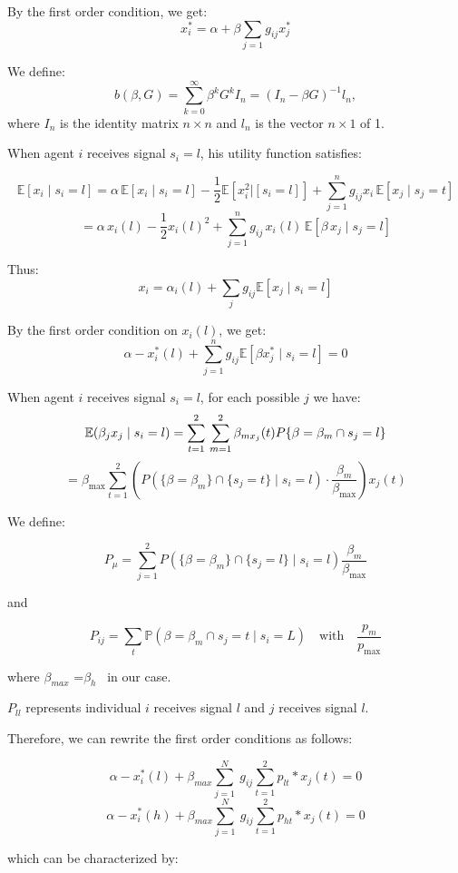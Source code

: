 \documentclass[12pt]{article}
\begin{document}
By the first order condition, we get:
\[
x_i^* = \alpha + \beta \sum_{j = 1} g_{ij} x_j^*
\]

We define:
\[
b(\beta, G) = \sum_{k=0}^{\infty} \beta^k G^k I_n = (I_n - \beta G)^{-1} l_n,
\]
where \( I_n \) is the identity matrix \( n \times n \) and \( l_n \) is the vector \( n \times 1 \) of 1.

When agent $i$ receives signal $s_i = l$, his utility function satisfies:


\[
\mathbb{E}[x_i \mid s_i = l] = \alpha \, \mathbb{E}[x_i \mid s_i = l]
-\frac{1}{2}\mathbb{E}[x_i^2|[s_i=l]]+ \sum_{j = 1}^n g_{ij} x_i\, \mathbb{E}[x_j \mid s_j = t]
\]
\[
= \alpha \, x_i(l) - \frac{1}{2} x_i(l)^2 + \sum_{j=1}^{n} g_{ij} \, x_i(l) \, \mathbb{E}\left[ \beta \, x_j \mid s_j = l \right]
\]


Thus:
\[
x_i = \alpha_i(l) + \sum_j g_{ij} \mathbb{E}[x_j \mid s_i = l]
\]

By the first order condition on $x_i(l)$, we get:
\[
\alpha -x_i^*(l) +\sum_{j=1}^{n} g_{ij} \mathbb{E}[\beta x_j^* \mid s_i = l]=0
\]

When agent $i$ receives signal $s_i =l$, for each possible $j$ we have:
\[
\mathbb{E}(\beta_j x_j \mid s_i = l) = \sum_{t=1}^{2} \\
\sum_{m=1}^{2} \beta_{mx_j}(t) P\{\beta = \beta_m \cap s_j = l\}
\]
\[
= \beta_{\max} \sum_{t=1}^{2} \left( P\left( \{\beta = \beta_m\} \cap \{s_j = t\} \mid s_i = l \right) \cdot \frac{\beta_m}{\beta_{\max}} \right)x_j(t)
\]



We define:

\[
P_{\mu} = \sum_{j=1}^{2}P(\{\beta = \beta_m\} \cap\{ s_j = l\} \mid s_i = l)\frac{\beta_m}{\beta_{\max}}
\]

and

\[
P_{ij} = \sum_{t} \mathbb{P}(\beta = \beta_m \cap s_j = t \mid s_i = L)
\quad \text{with} \quad \frac{p_m}{p_{\max}}
\]

where $\beta_{max}$ =$\beta_h$ \  in our case.

$P_{ll}$ represents individual $i$ receives signal $l$ and $j$ receives signal $l$.

Therefore, we can rewrite the first order conditions as follows:

\[
\alpha - x_i ^*(l)+ \beta_{max}  \sum_{j=1}^{N}\ g_{ij} \sum_{t=1}^{2}p_{lt}*x_j(t)=0
\]
\[
\alpha - x_i ^*(h)+ \beta_{max}  \sum_{j=1}^{N}\ g_{ij} \sum_{t=1}^{2}p_{ht}*x_j(t)=0
\]

which can be characterized by:
\end{document}
